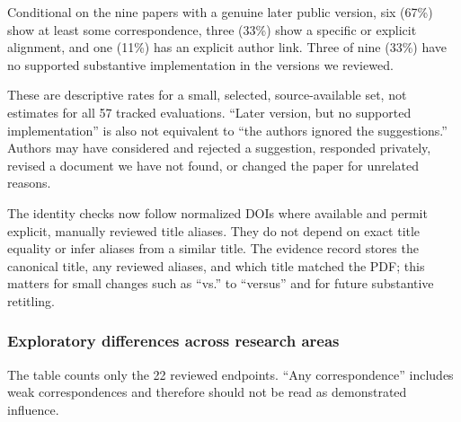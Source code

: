 \documentclass[
  11pt,
  letterpaper,
]{article}
\begin{document}
Conditional on the nine papers with a genuine later public version, six
(67\%) show at least some correspondence, three (33\%) show a specific
or explicit alignment, and one (11\%) has an explicit author link. Three
of nine (33\%) have no supported substantive implementation in the
versions we reviewed.

These are descriptive rates for a small, selected, source-available set,
not estimates for all 57 tracked evaluations. ``Later version, but no
supported implementation'' is also not equivalent to ``the authors
ignored the suggestions.'' Authors may have considered and rejected a
suggestion, responded privately, revised a document we have not found,
or changed the paper for unrelated reasons.

The identity checks now follow normalized DOIs where available and
permit explicit, manually reviewed title aliases. They do not depend on
exact title equality or infer aliases from a similar title. The evidence
record stores the canonical title, any reviewed aliases, and which title
matched the PDF; this matters for small changes such as ``vs.'' to
``versus'' and for future substantive retitling.

\subsubsection{Exploratory differences across research
areas}\label{exploratory-differences-across-research-areas}

The table counts only the 22 reviewed endpoints. ``Any correspondence''
includes weak correspondences and therefore should not be read as
demonstrated influence.
\end{document}
